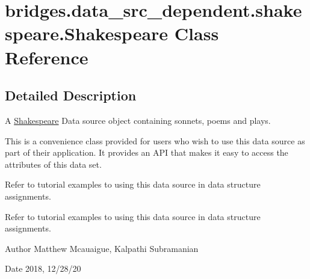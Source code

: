 \hypertarget{classbridges_1_1data__src__dependent_1_1shakespeare_1_1_shakespeare}{}\section{bridges.\+data\+\_\+src\+\_\+dependent.\+shakespeare.\+Shakespeare Class Reference}
\label{classbridges_1_1data__src__dependent_1_1shakespeare_1_1_shakespeare}


\subsection{Detailed Description}
A \hyperlink{classbridges_1_1data__src__dependent_1_1shakespeare_1_1_shakespeare}{Shakespeare} Data source object containing sonnets, poems and plays. 

This is a convenience class provided for users who wish to use this data source as part of their application. It provides an A\+PI that makes it easy to access the attributes of this data set.

Refer to tutorial examples to using this data source in data structure assignments.

Refer to tutorial examples to using this data source in data structure assignments. \begin{DoxyAuthor}{Author}
Matthew Mcauaigue, Kalpathi Subramanian
\end{DoxyAuthor}
\begin{DoxyDate}{Date}
2018, 12/28/20 
\end{DoxyDate}
